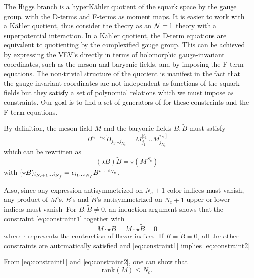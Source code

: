             The Higgs branch is a hyperKähler quotient of the squark space by the gauge group, with the D-terms and F-terms as moment maps. It is easier to work with a Kähler quotient, thus consider the theory as an $\mathcal{N}=1$ theory with a superpotential interaction. In a Kähler quotient, the D-term equations are equivalent to quotienting by the complexified gauge group. This can be achieved by expressing the VEV's directly in terms of holomorphic gauge-invariant coordinates, such as the meson and baryonic fields, and by imposing the F-term equations. The non-trivial structure of the quotient is manifest in the fact that the gauge invariant coordinates are not independent as functions of the squark fields but they satisfy a set of polynomial relations which we must impose as constraints. Our goal is to find a set of generators of for these constraints and the F-term equations.

            By definition, the meson field $M$ and the baryonic fields $B,\tilde{B}$ must satisfy
            \begin{equation}
                B^{i_1\dots i_{N_c}}\tilde{B}_{j_1\dots j_{N_c}}=M^{[i_1}_{j_1}\dots M^{i_{N_c}]}_{j_{N_c}}
            \end{equation}
            which can be rewritten as
            \begin{equation}
                (\star B)\tilde{B}=\star(M^{N_c})\label{eq:constraint1}
            \end{equation}
            with $(\star B)_{i_{N_c+1}\dots i_{N_f}}=\epsilon_{i_1\dots i_{N_f}}B^{i_1\dots i_{N_c}}$.
            
            Also, since any expression antisymmetrized on $N_c+1$ color indices must vanish, any product of $M$'s, $B$'s and $\tilde{B}$'s antisymmetrized on $N_c+1$ upper or lower indices must vanish. For $B,\tilde{B}\neq0$, an induction argument shows that the constraint \eqref{eq:constraint1} together with
            \begin{equation}
                M\cdot\star B=M\cdot\star\tilde{B}=0\label{eq:constraint2}
            \end{equation}
            where $\cdot$ represents the contraction of flavor indices. If $B=\tilde{B}=0$, all the other constraints are automatically satisfied and \eqref{eq:constraint1} implies \eqref{eq:constraint2}

            From \eqref{eq:constraint1} and \eqref{eq:constraint2}, one can show that
            \begin{equation}
                \text{rank}(M)\leq N_c.
            \end{equation}

